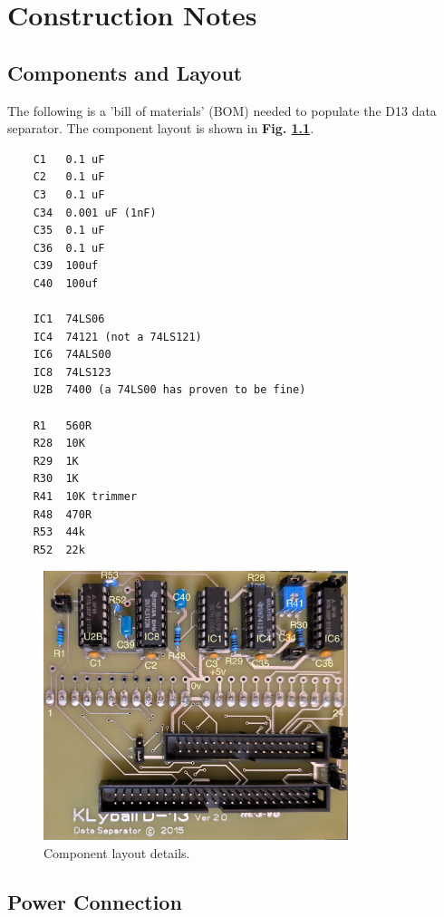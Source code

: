\chapter{Construction Notes}

\section{Components and Layout}

The following is a 'bill of materials' (BOM) needed to populate the D13 data separator. The component layout is shown in \textbf{Fig. \ref{fig:layout}}.

\begin{verbatim}
    C1   0.1 uF
    C2   0.1 uF
    C3   0.1 uF
    C34  0.001 uF (1nF)
    C35  0.1 uF
    C36  0.1 uF
    C39  100uf
    C40  100uf
    
    IC1  74LS06
    IC4  74121 (not a 74LS121)
    IC6  74ALS00
    IC8  74LS123
    U2B  7400 (a 74LS00 has proven to be fine)
    
    R1   560R
    R28  10K
    R29  1K
    R30  1K
    R41  10K trimmer
    R48  470R
    R53  44k
    R52  22k
\end{verbatim}

\begin{figure}[htbp]
\begin{center}
\includegraphics[width=3.5in]{images/D13Layout.jpg}
\caption{Component layout details.}
\label{fig:layout}
\end{center}
\end{figure}

\section{Power Connection}

